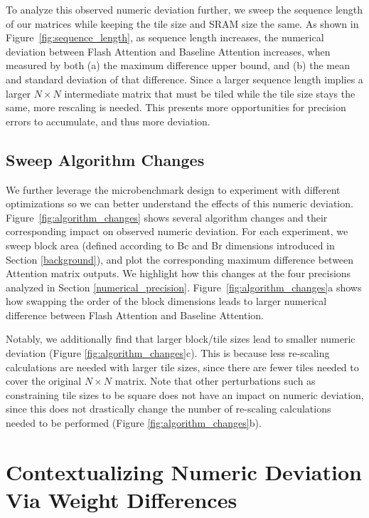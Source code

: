 To analyze this observed numeric deviation further, we sweep the sequence length of our matrices while keeping the tile size and SRAM size the same. As shown in Figure~\ref{fig:sequence_length}, as sequence length increases, the numerical deviation between Flash Attention and Baseline Attention increases, when measured by both (a) the maximum difference upper bound, and (b) the mean and standard deviation of that difference. Since a larger sequence length implies a larger $N\times N$ intermediate matrix that must be tiled while the tile size stays the same, more rescaling is needed. This presents more opportunities for precision errors to accumulate, and thus more deviation.

\subsection{Sweep Algorithm Changes}

We further leverage the microbenchmark design to experiment with different optimizations so we can better understand the effects of this numeric deviation. Figure~\ref{fig:algorithm_changes} shows several algorithm changes and their corresponding impact on observed numeric deviation. For each experiment, we sweep block area (defined according to Bc and Br dimensions introduced in Section \ref{background}), and plot the corresponding maximum difference between Attention matrix outputs. We highlight how this changes at the four precisions analyzed in Section \ref{numerical_precision}. Figure~\ref{fig:algorithm_changes}a shows how swapping the order of the block dimensions leads to larger numerical difference between Flash Attention and Baseline Attention. 

Notably, we additionally find that larger block/tile sizes lead to smaller numeric deviation (Figure \ref{fig:algorithm_changes}c). This is because less re-scaling calculations are needed with larger tile sizes, since there are fewer tiles needed to cover the original $N\times N$ matrix. Note that other perturbations such as constraining tile sizes to be square does not have an impact on numeric deviation, since this does not drastically change the number of re-scaling calculations needed to be performed (Figure \ref{fig:algorithm_changes}b).

\section{Contextualizing Numeric Deviation Via Weight Differences} \label{weight_differences}

